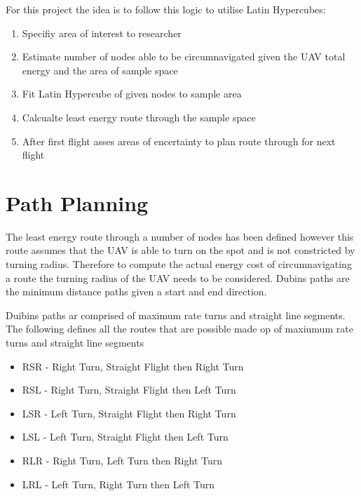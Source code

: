 \documentclass[a4paper,12pt,twoside]{article}
\begin{document}
For this project the idea is to follow this logic to utilise Latin Hypercubes:

\begin{enumerate}
\item Specifiy area of interest to researcher
\item Estimate number of nodes able to be circumnavigated given the UAV total energy and the area of sample space
\item Fit Latin Hypercube of given nodes to sample area
\item Calcualte least energy route through the sample space
\item After first flight asses areas of encertainty to plan route through for next flight

\end{enumerate}

\section{Path Planning}
\label{sec:path_planning}

The least energy route through a number of nodes has been defined however this route assumes that the UAV is able to turn on the spot and is not constricted by turning radius. Therefore to compute the actual energy cost of circumnavigating a route the turning radius of the UAV needs to be considered. Dubins paths are the minimum distance paths given a start and end direction.

Duibins paths ar comprised of maximum rate turns and straight line segments. The following defines all the routes that are possible made op of maxiumum rate turns and straight line segments

\begin{itemize}
\item RSR - Right Turn, Straight Flight then Right Turn
\item RSL - Right Turn, Straight Flight then Left Turn
\item LSR - Left Turn, Straight Flight then Right Turn
\item LSL - Left Turn, Straight Flight then Left Turn
\item RLR - Right Turn, Left Turn then Right Turn
\item LRL - Left Turn, Right Turn then Left Turn

\end{itemize}
\end{document}
